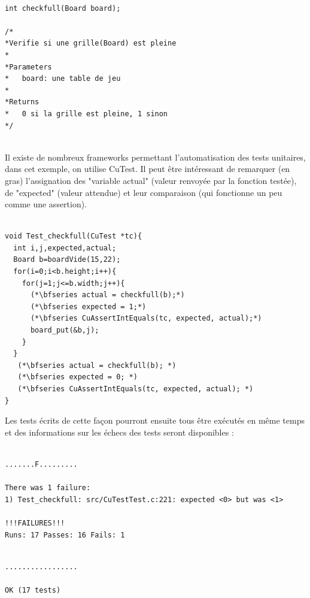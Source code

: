 \documentclass{report}
\begin{document}
\begin{scriptsize}
\begin{lstlisting}

int checkfull(Board board);

/*
*Verifie si une grille(Board) est pleine
*
*Parameters
*   board: une table de jeu
*
*Returns
*   0 si la grille est pleine, 1 sinon
*/


\end{lstlisting}
\end{scriptsize}

Il existe de nombreux frameworks permettant l'automatisation des tests unitaires, dans cet exemple, on utilise CuTest. Il peut être intéressant de remarquer (en gras) l'assignation des "variable actual" (valeur renvoyée par la fonction testée), de "expected" (valeur attendue) et leur comparaison (qui fonctionne un peu comme une assertion).
\begin{scriptsize}
\begin{lstlisting}

void Test_checkfull(CuTest *tc){
  int i,j,expected,actual;
  Board b=boardVide(15,22);
  for(i=0;i<b.height;i++){
    for(j=1;j<=b.width;j++){
      (*\bfseries actual = checkfull(b);*)
      (*\bfseries expected = 1;*)
      (*\bfseries CuAssertIntEquals(tc, expected, actual);*)
      board_put(&b,j);
    }
  }
   (*\bfseries actual = checkfull(b); *)
   (*\bfseries expected = 0; *)
   (*\bfseries CuAssertIntEquals(tc, expected, actual); *)
}

\end{lstlisting}
\end{scriptsize}

Les tests écrits de cette façon pourront ensuite tous être exécutés en même temps et des informations sur les échecs des tests seront disponibles :

\begin{scriptsize}
\begin{lstlisting}

.......F.........

There was 1 failure:
1) Test_checkfull: src/CuTestTest.c:221: expected <0> but was <1>

!!!FAILURES!!!
Runs: 17 Passes: 16 Fails: 1

\end{lstlisting}
\begin{lstlisting}

.................

OK (17 tests)
\end{lstlisting}
\end{scriptsize}
\end{document}
